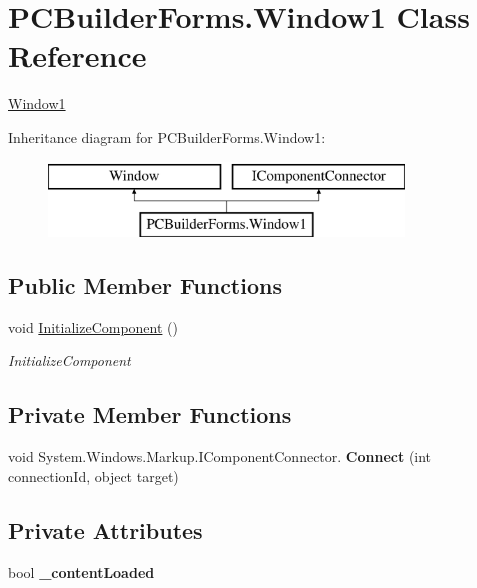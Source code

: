 \hypertarget{class_p_c_builder_forms_1_1_window1}{}\section{P\+C\+Builder\+Forms.\+Window1 Class Reference}
\label{class_p_c_builder_forms_1_1_window1}


\hyperlink{class_p_c_builder_forms_1_1_window1}{Window1}  


Inheritance diagram for P\+C\+Builder\+Forms.\+Window1\+:\begin{figure}[H]
\begin{center}
\leavevmode
\includegraphics[height=2.000000cm]{class_p_c_builder_forms_1_1_window1}
\end{center}
\end{figure}
\subsection*{Public Member Functions}
\begin{DoxyCompactItemize}
\item 
void \hyperlink{class_p_c_builder_forms_1_1_window1_a5cda1cb9593c778c04476a1584714a4c}{Initialize\+Component} ()
\begin{DoxyCompactList}\small\item\em Initialize\+Component \end{DoxyCompactList}\end{DoxyCompactItemize}
\subsection*{Private Member Functions}
\begin{DoxyCompactItemize}
\item 
void System.\+Windows.\+Markup.\+I\+Component\+Connector. {\bfseries Connect} (int connection\+Id, object target)\hypertarget{class_p_c_builder_forms_1_1_window1_a0540083e435f2a48f9cbc604ffaffff4}{}\label{class_p_c_builder_forms_1_1_window1_a0540083e435f2a48f9cbc604ffaffff4}

\end{DoxyCompactItemize}
\subsection*{Private Attributes}
\begin{DoxyCompactItemize}
\item 
bool {\bfseries \+\_\+content\+Loaded}\hypertarget{class_p_c_builder_forms_1_1_window1_a31e5fc9ff6f8e2ad6453b364c986175d}{}\label{class_p_c_builder_forms_1_1_window1_a31e5fc9ff6f8e2ad6453b364c986175d}

\end{DoxyCompactItemize}


